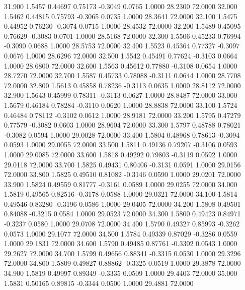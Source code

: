   31.900   1.5457   0.44697   0.75173  -0.3049   0.0765   1.0000  28.2300  72.0000
  32.000   1.5462   0.44815   0.75793  -0.3065   0.0735   1.0000  28.3641  72.0000
  32.100   1.5475   0.44952   0.76230  -0.3074   0.0715   1.0000  28.4532  72.0000
  32.200   1.5489   0.45095   0.76629  -0.3083   0.0701   1.0000  28.5168  72.0000
  32.300   1.5506   0.45233   0.76994  -0.3090   0.0688   1.0000  28.5753  72.0000
  32.400   1.5523   0.45364   0.77327  -0.3097   0.0676   1.0000  28.6296  72.0000
  32.500   1.5542   0.45491   0.77624  -0.3103   0.0664   1.0000  28.6800  72.0000
  32.600   1.5563   0.45612   0.77880  -0.3108   0.0654   1.0000  28.7270  72.0000
  32.700   1.5587   0.45733   0.78088  -0.3111   0.0644   1.0000  28.7708  72.0000
  32.800   1.5613   0.45858   0.78236  -0.3113   0.0635   1.0000  28.8112  72.0000
  32.900   1.5643   0.45999   0.78311  -0.3113   0.0627   1.0000  28.8487  72.0000
  33.000   1.5679   0.46184   0.78284  -0.3110   0.0620   1.0000  28.8838  72.0000
  33.100   1.5724   0.46484   0.78112  -0.3102   0.0612   1.0000  28.9181  72.0000
  33.200   1.5795   0.47279   0.77579  -0.3082   0.0603   1.0000  28.9604  72.0000
  33.300   1.5797   0.48788   0.78021  -0.3082   0.0594   1.0000  29.0028  72.0000
  33.400   1.5804   0.48968   0.78613  -0.3094   0.0593   1.0000  29.0055  72.0000
  33.500   1.5811   0.49136   0.79207  -0.3106   0.0593   1.0000  29.0085  72.0000
  33.600   1.5818   0.49292   0.79803  -0.3119   0.0592   1.0000  29.0118  72.0000
  33.700   1.5825   0.49431   0.80406  -0.3131   0.0591   1.0000  29.0156  72.0000
  33.800   1.5825   0.49510   0.81082  -0.3146   0.0590   1.0000  29.0201  72.0000
  33.900   1.5824   0.49559   0.81777  -0.3161   0.0589   1.0000  29.0255  72.0000
  34.000   1.5819   0.49565   0.82516  -0.3178   0.0588   1.0000  29.0321  72.0000
  34.100   1.5814   0.49546   0.83280  -0.3196   0.0586   1.0000  29.0405  72.0000
  34.200   1.5808   0.49501   0.84088  -0.3215   0.0584   1.0000  29.0523  72.0000
  34.300   1.5800   0.49423   0.84971  -0.3237   0.0580   1.0000  29.0708  72.0000
  34.400   1.5790   0.49327   0.85993  -0.3262   0.0573   1.0000  29.1077  72.0000
  34.500   1.5784   0.49339   0.87029  -0.3286   0.0559   1.0000  29.1831  72.0000
  34.600   1.5790   0.49485   0.87761  -0.3302   0.0543   1.0000  29.2627  72.0000
  34.700   1.5799   0.49656   0.88341  -0.3315   0.0530   1.0000  29.3296  72.0000
  34.800   1.5809   0.49827   0.88862  -0.3325   0.0519   1.0000  29.3878  72.0000
  34.900   1.5819   0.49997   0.89349  -0.3335   0.0509   1.0000  29.4403  72.0000
  35.000   1.5831   0.50165   0.89815  -0.3344   0.0500   1.0000  29.4881  72.0000
